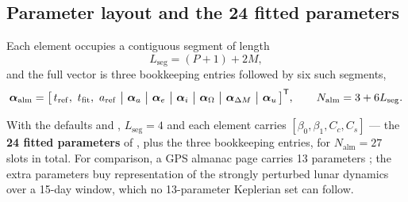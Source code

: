 \subsection{Parameter layout and the 24 fitted parameters}

Each element occupies a contiguous segment of length
\begin{equation}
  \label{eq:eph-alm-seg}
  L_\mathrm{seg} = (P + 1) + 2M,
\end{equation}
and the full vector is three bookkeeping entries followed by six such
segments,
\begin{equation}
  \label{eq:eph-alm-params}
  \vec{\alpha}_\mathrm{alm} =
  \big[\,t_\mathrm{ref},\ t_\mathrm{fit},\ a_\mathrm{ref}\ \big|\
        \vec{\alpha}_a\ \big|\ \vec{\alpha}_e\ \big|\ \vec{\alpha}_i\ \big|\
        \vec{\alpha}_\Omega\ \big|\ \vec{\alpha}_{\Delta M}\ \big|\
        \vec{\alpha}_{u}\,\big]\transpose,
  \qquad
  N_\mathrm{alm} = 3 + 6L_\mathrm{seg}.
\end{equation}

With the defaults  and ,
$L_\mathrm{seg} = 4$ and each element carries
$[\beta_0, \beta_1, C_c, C_s]$ --- the \textbf{24 fitted parameters} of
\citep[\S8.1]{iiyama2026thesis}, plus the three bookkeeping entries, for
$N_\mathrm{alm} = 27$ slots in total. For comparison, a GPS almanac page
carries 13 parameters \citep{icdgps200}; the extra parameters buy
representation of the strongly perturbed lunar dynamics over a 15-day window,
which no 13-parameter Keplerian set can follow.

